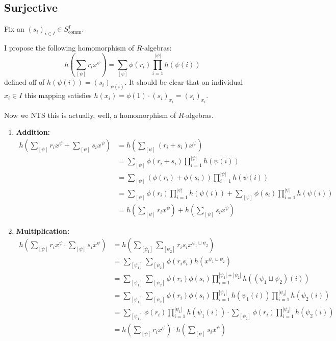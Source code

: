 \documentclass[12pt]{article}
\begin{document}
\pagebreak

\subsection{Surjective}

Fix an $(s_i)_{i \in I} \in S^I_{\text{comm}}$.

I propose the following homomorphism of $R$-algebras:
\[h\left(\sum_{[\psi]} r_i x^\psi\right)
  =\sum_{[\psi]} \phi(r_i) \prod_{i=1}^{|\psi|} h(\psi(i))\]
defined off of $h(\psi(i))=(s_i)_{\psi(i)}$.
It should be clear that on individual $x_i \in I$ this mapping satisfies
$h(x_i)=\phi(1) \cdot (s_i)_{x_i} = (s_i)_{x_i}$.

Now we NTS this is actually, well, a homomorphism of $R$-algebras.
\begin{enumerate}
  \item \textbf{Addition:}
        \begin{align*}
          h\left(\sum_{[\psi]} r_i x^\psi+\sum_{[\psi]} s_i x^\psi\right)
           & = h\left(\sum_{[\psi]} (r_i+s_i) x^\psi\right)                       \\
           & =\sum_{[\psi]} \phi(r_i+s_i) \prod_{i=1}^{|\psi|} h(\psi(i))         \\
           & =\sum_{[\psi]} (\phi(r_i)+\phi(s_i)) \prod_{i=1}^{|\psi|} h(\psi(i)) \\
           & = \sum_{[\psi]} \phi(r_i) \prod_{i=1}^{|\psi|} h(\psi(i))
          + \sum_{[\psi]} \phi(s_i) \prod_{i=1}^{|\psi|} h(\psi(i))               \\
           & = h\left(\sum_{[\psi]} r_i x^\psi\right)
          +h\left(\sum_{[\psi]} s_i x^\psi\right)
        \end{align*}

  \item \textbf{Multiplication:}
        \begin{align*}
          h\left(\sum_{[\psi]} r_i x^\psi \cdot \sum_{[\psi]} s_i x^\psi\right)
           & = h\left(\sum_{[\psi_1]} \sum_{[\psi_2]} r_i s_i x^{\psi_1 \sqcup \psi_2}\right)                                                    \\
           & = \sum_{[\psi_1]} \sum_{[\psi_2]} \phi(r_i s_i) h\left(x^{\psi_1 \sqcup \psi_2}\right)                                              \\
           & = \sum_{[\psi_1]} \sum_{[\psi_2]} \phi(r_i)\phi(s_i) \prod_{i=1}^{|\psi_1|+|\psi_2|} h((\psi_1 \sqcup \psi_2)(i))                   \\
           & = \sum_{[\psi_1]} \sum_{[\psi_2]} \phi(r_i)\phi(s_i) \prod_{i=1}^{|\psi_1|} h(\psi_1(i)) \prod_{i=1}^{|\psi_2|} h(\psi_2(i))        \\
           & = \sum_{[\psi_1]} \phi(r_i) \prod_{i=1}^{|\psi_1|} h(\psi_1(i)) \cdot \sum_{[\psi_2]} \phi(r_i) \prod_{i=1}^{|\psi_2|} h(\psi_2(i)) \\
           & = h\left(\sum_{[\psi]} r_i x^\psi\right) \cdot h\left(\sum_{[\psi]} s_i x^\psi\right)
        \end{align*}


\end{enumerate}
\end{document}
